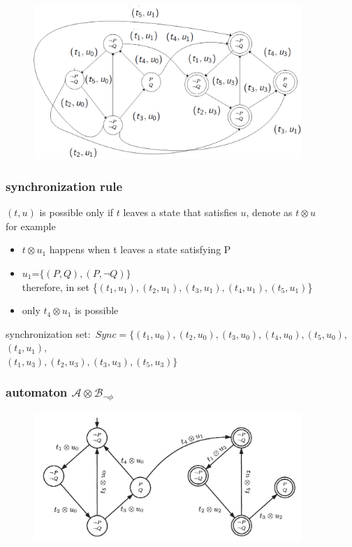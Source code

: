 \documentclass{beamer}
\begin{document}
    \begin{frame}
        \begin{figure}
            \centering
            \includegraphics[width=4.0in]{cartesian.png}
        \end{figure}
    \end{frame}

    \begin{frame}
        \frametitle{synchronization rule}
        $(t,u)$ is possible only if $t$ leaves a state that satisfies $u$, denote as $t\otimes u$ \\
        for example \\
        \begin{itemize}
          \item $t\otimes u_1$ happens when t leaves a state satisfying P\\
          \item $u_1$=$\{(P,Q),(P,\neg Q)\}$ \\
                therefore, in set \{$(t_1,u_1),(t_2,u_1),(t_3,u_1),(t_4,u_1),(t_5,u_1)$\}\\
          \item only $t_4\otimes u_1$ is possible
        \end{itemize}

        synchronization set:\
        $Sync=\{(t_1,u_0),(t_2,u_0),(t_3,u_0),(t_4,u_0),(t_5,u_0),$\\
        \quad\qquad$(t_4,u_1),$\\
        \quad\qquad $(t_1,u_3),(t_2,u_3),(t_3,u_3),(t_5,u_3)\}$
    \end{frame}

    \begin{frame}
        \frametitle{automaton $\mathcal{A}\otimes\mathcal{B}_{\neg\phi}$}
        \begin{figure}
            \centering
            \includegraphics[width=4.0in]{3_3.jpg}
        \end{figure}

    \end{frame}

    \begin{frame}
    \end{frame}
\end{document}
